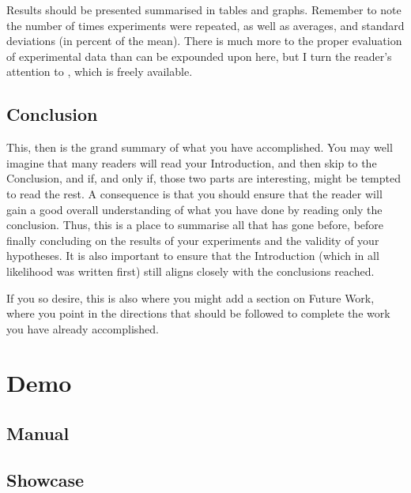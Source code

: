 \documentclass[ twoside,openright,titlepage,numbers=noenddot,headinclude,%
                footinclude=true,cleardoublepage=empty,abstractoff, %
                BCOR=5mm,paper=a4,fontsize=11pt,%
                ngerman,american,%
                ]{scrreprt}
\begin{document}
Results should be presented summarised in tables and graphs.  Remember
to note the number of times experiments were repeated, as well as
averages, and standard deviations (in percent of the mean).  There is
much more to the proper evaluation of experimental data than can be
expounded upon here, but I turn the reader's attention to
\citep{Downey2011:TSPASFP2011}, which is freely available.


\chapter{Conclusion}
\label{cha:conclusion}

This, then is the grand summary of what you have accomplished.  You
may well imagine that many readers will read your Introduction, and
then skip to the Conclusion, and if, and only if, those two parts are
interesting, might be tempted to read the rest. A consequence is that
you should ensure that the reader will gain a good overall
understanding of what you have done by reading only the conclusion.
Thus, this is a place to summarise all that has gone before, before
finally concluding on the results of your experiments and the validity
of your hypotheses. It is also important to ensure that the
Introduction (which in all likelihood was written first) still aligns
closely with the conclusions reached.

If you so desire, this is also where you might add a section on Future
Work, where you point in the directions that should be followed to
complete the work you have already accomplished.



\part{Demo}
\label{part:manual}
\chapter{Manual}

\cleardoublepage

\chapter{Showcase}



\appendix
\cleardoublepage
\end{document}
